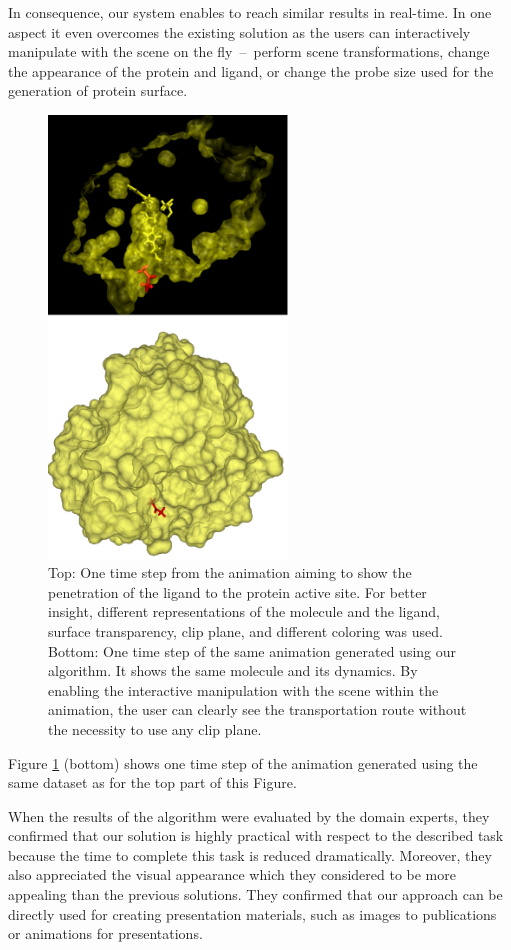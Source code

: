 In consequence, our system enables to reach similar results in real-time. 
In one aspect it even overcomes the existing solution as the users can interactively manipulate with the scene on the fly~--~perform scene transformations, change the appearance of the protein and ligand, or change the probe size used for the generation of protein surface.

\begin{figure}[htp]
  \centering
    \includegraphics[width=2.5in]{image/animation.png}
  \caption{Top: One time step from the animation aiming to show the penetration of the ligand to the protein active site. For better insight, different representations of the molecule and the ligand, surface transparency, clip plane, and different coloring was used. Bottom: One time step of the same animation generated using our algorithm. It shows the same molecule and its dynamics. By enabling the interactive manipulation with the scene within the animation, the user can clearly see the transportation route without the necessity to use any clip plane.}
\label{fig:animation}
\end{figure}
Figure \ref{fig:animation} (bottom) shows one time step of the animation generated using the same dataset as for the top part of this Figure.

When the results of the algorithm were evaluated by the domain experts, they confirmed that our solution is highly practical with respect to the described task because the time to complete this task is reduced dramatically.
Moreover, they also appreciated the visual appearance which they considered to be more appealing than the previous solutions.
They confirmed that our approach can be directly used for creating presentation materials, such as images to publications or animations for presentations.

